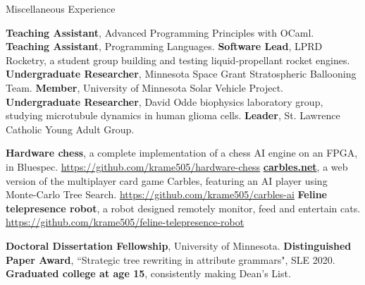 \begin{rubric}{Miscellaneous Experience}

\entry*[2019] \textbf{Teaching Assistant}, Advanced Programming Principles with OCaml.
\entry*[2016] \textbf{Teaching Assistant}, Programming Languages.
\entry*[2016 -- 2020] \textbf{Software Lead}, LPRD Rocketry, a student group building and testing liquid-propellant rocket engines.
\entry*[2013 -- 2015] \textbf{Undergraduate Researcher}, Minnesota Space Grant Stratospheric Ballooning Team.
\entry*[2011 -- 2015] \textbf{Member}, University of Minnesota Solar Vehicle Project.
\entry*[2012] \textbf{Undergraduate Researcher}, David Odde biophysics laboratory group, studying microtubule dynamics in human glioma cells.
\entry*[2022 -- 2023] \textbf{Leader}, St. Lawrence Catholic Young Adult Group.

\entry*[2022] \textbf{Hardware chess}, a complete implementation of a chess AI engine on an FPGA, in Bluespec.
\url{https://github.com/krame505/hardware-chess}
\entry*[2020] \textbf{\href{https://carbles.net}{carbles.net}}, a web version of the multiplayer card game Carbles, featuring an AI player using Monte-Carlo Tree Search.
\url{https://github.com/krame505/carbles-ai}
\entry*[2020] \textbf{Feline telepresence robot}, a robot designed remotely monitor, feed and entertain cats.
\url{https://github.com/krame505/feline-telepresence-robot}


\entry*[2024 -- 2025] \textbf{Doctoral Dissertation Fellowship}, University of Minnesota.
\entry*[2020] \textbf{Distinguished Paper Award}, “Strategic tree rewriting in attribute grammars", SLE 2020.
%
\entry*[2015] \textbf{Graduated college at age 15}, consistently making Dean's List.

\end{rubric}